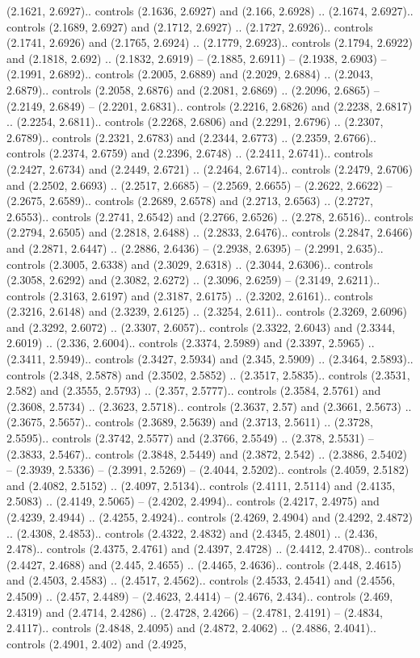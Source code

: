 (2.1621, 2.6927).. controls (2.1636, 2.6927) and (2.166, 2.6928) .. (2.1674, 2.6927).. controls (2.1689, 2.6927) and (2.1712, 2.6927) .. (2.1727, 2.6926).. controls (2.1741, 2.6926) and (2.1765, 2.6924) .. (2.1779, 2.6923).. controls (2.1794, 2.6922) and (2.1818, 2.692) .. (2.1832, 2.6919) -- (2.1885, 2.6911) -- (2.1938, 2.6903) -- (2.1991, 2.6892).. controls (2.2005, 2.6889) and (2.2029, 2.6884) .. (2.2043, 2.6879).. controls (2.2058, 2.6876) and (2.2081, 2.6869) .. (2.2096, 2.6865) -- (2.2149, 2.6849) -- (2.2201, 2.6831).. controls (2.2216, 2.6826) and (2.2238, 2.6817) .. (2.2254, 2.6811).. controls (2.2268, 2.6806) and (2.2291, 2.6796) .. (2.2307, 2.6789).. controls (2.2321, 2.6783) and (2.2344, 2.6773) .. (2.2359, 2.6766).. controls (2.2374, 2.6759) and (2.2396, 2.6748) .. (2.2411, 2.6741).. controls (2.2427, 2.6734) and (2.2449, 2.6721) .. (2.2464, 2.6714).. controls (2.2479, 2.6706) and (2.2502, 2.6693) .. (2.2517, 2.6685) -- (2.2569, 2.6655) -- (2.2622, 2.6622) -- (2.2675, 2.6589).. controls (2.2689, 2.6578) and (2.2713, 2.6563) .. (2.2727, 2.6553).. controls (2.2741, 2.6542) and (2.2766, 2.6526) .. (2.278, 2.6516).. controls (2.2794, 2.6505) and (2.2818, 2.6488) .. (2.2833, 2.6476).. controls (2.2847, 2.6466) and (2.2871, 2.6447) .. (2.2886, 2.6436) -- (2.2938, 2.6395) -- (2.2991, 2.635).. controls (2.3005, 2.6338) and (2.3029, 2.6318) .. (2.3044, 2.6306).. controls (2.3058, 2.6292) and (2.3082, 2.6272) .. (2.3096, 2.6259) -- (2.3149, 2.6211).. controls (2.3163, 2.6197) and (2.3187, 2.6175) .. (2.3202, 2.6161).. controls (2.3216, 2.6148) and (2.3239, 2.6125) .. (2.3254, 2.611).. controls (2.3269, 2.6096) and (2.3292, 2.6072) .. (2.3307, 2.6057).. controls (2.3322, 2.6043) and (2.3344, 2.6019) .. (2.336, 2.6004).. controls (2.3374, 2.5989) and (2.3397, 2.5965) .. (2.3411, 2.5949).. controls (2.3427, 2.5934) and (2.345, 2.5909) .. (2.3464, 2.5893).. controls (2.348, 2.5878) and (2.3502, 2.5852) .. (2.3517, 2.5835).. controls (2.3531, 2.582) and (2.3555, 2.5793) .. (2.357, 2.5777).. controls (2.3584, 2.5761) and (2.3608, 2.5734) .. (2.3623, 2.5718).. controls (2.3637, 2.57) and (2.3661, 2.5673) .. (2.3675, 2.5657).. controls (2.3689, 2.5639) and (2.3713, 2.5611) .. (2.3728, 2.5595).. controls (2.3742, 2.5577) and (2.3766, 2.5549) .. (2.378, 2.5531) -- (2.3833, 2.5467).. controls (2.3848, 2.5449) and (2.3872, 2.542) .. (2.3886, 2.5402) -- (2.3939, 2.5336) -- (2.3991, 2.5269) -- (2.4044, 2.5202).. controls (2.4059, 2.5182) and (2.4082, 2.5152) .. (2.4097, 2.5134).. controls (2.4111, 2.5114) and (2.4135, 2.5083) .. (2.4149, 2.5065) -- (2.4202, 2.4994).. controls (2.4217, 2.4975) and (2.4239, 2.4944) .. (2.4255, 2.4924).. controls (2.4269, 2.4904) and (2.4292, 2.4872) .. (2.4308, 2.4853).. controls (2.4322, 2.4832) and (2.4345, 2.4801) .. (2.436, 2.478).. controls (2.4375, 2.4761) and (2.4397, 2.4728) .. (2.4412, 2.4708).. controls (2.4427, 2.4688) and (2.445, 2.4655) .. (2.4465, 2.4636).. controls (2.448, 2.4615) and (2.4503, 2.4583) .. (2.4517, 2.4562).. controls (2.4533, 2.4541) and (2.4556, 2.4509) .. (2.457, 2.4489) -- (2.4623, 2.4414) -- (2.4676, 2.434).. controls (2.469, 2.4319) and (2.4714, 2.4286) .. (2.4728, 2.4266) -- (2.4781, 2.4191) -- (2.4834, 2.4117).. controls (2.4848, 2.4095) and (2.4872, 2.4062) .. (2.4886, 2.4041).. controls (2.4901, 2.402) and (2.4925, 